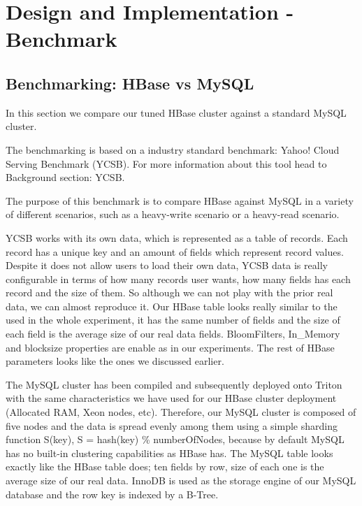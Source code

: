 \chapter{Design and Implementation - Benchmark}
\label{chapter:Design and Implementation - Benchmark}
 
\section{Benchmarking: HBase vs MySQL}

In this section we compare our tuned HBase cluster against a standard MySQL cluster.

\bigskip

The benchmarking is based on a industry standard benchmark: Yahoo! Cloud Serving Benchmark (YCSB). For more information about this tool head to Background section: YCSB.
\par
The purpose of this benchmark is to compare HBase against MySQL in a variety of different scenarios, such as a heavy-write scenario or a heavy-read scenario. 
\par
YCSB works with its own data, which is represented as a table of records. Each record has a unique key and an amount of fields which represent record values. Despite it does not allow users to load their own data, YCSB data is really configurable in terms of how many records user wants, how many fields has each record and the size of them. So although we can not play with the prior real data, we can almost reproduce it. Our HBase table looks really similar to the used in the whole experiment, it has the same number of fields and the size of each field is the average size of our real data fields. BloomFilters, In\_Memory and blocksize properties are enable as in our experiments. The rest of HBase parameters looks like the ones we discussed earlier.
\par
The MySQL cluster has been compiled and subsequently deployed onto Triton with the same characteristics we have used for our HBase cluster deployment (Allocated RAM, Xeon nodes, etc). Therefore, our MySQL cluster is composed of five nodes and the data is spread evenly among them using a simple sharding function S(key), S = hash(key) \% numberOfNodes, because by default MySQL has no built-in clustering capabilities as HBase has. The MySQL table looks exactly like the HBase table does; ten fields by row, size of each one is the average size of our real data. InnoDB is used as the storage engine of our MySQL database and the row key is indexed by a B-Tree. 

